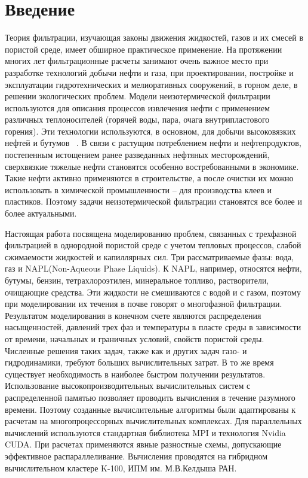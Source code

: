 \section{Введение}
Теория фильтрации, изучающая законы движения жидкостей, газов и их смесей в
пористой среде, имеет обширное практическое применение. На протяжении многих лет
фильтрационные расчеты занимают очень важное место при разработке технологий
добычи нефти и газа, при проектировании, постройке и эксплуатации
гидротехнических  и мелиоративных сооружений, в горном деле, в решении
экологических проблем.  Модели неизотермической фильтрации используются для описания
процессов извлечения нефти
с применением различных теплоносителей (горячей воды, пара, очага внутрипластового
горения). Эти технологии используются, в основном, для добычи высоковязких нефтей и бутумов ~\cite{Kanevskaya}.
В связи с растущим потреблением нефти и нефтепродуктов, постепенным истощением ранее разведанных
нефтяных месторождений, сверхвязкие тяжелые нефти становятся особенно востребованными в экономике. 
Такие нефти активно применяются в строительстве, а после очистки
их можно использовать в химической промышленности -- для производства клеев и пластиков.
Поэтому задачи неизотермической фильтрации
становятся все более и более актуальными.

Настоящая работа посвящена моделированию проблем, связанных с трехфазной фильтрацией 
в однородной пористой среде с учетом тепловых процессов, слабой сжимаемости жидкостей
и капиллярных сил.
Три рассматриваемые фазы: вода, газ и NAPL(Non-Aqueous Phase 
Liquids). К NAPL, например, относятся нефти, бутумы, бензин, тетрахлороэтилен, 
минеральное топливо, растворители, очищающие средства. 
Эти жидкости не смешиваются с водой и с газом,
поэтому при моделировании их течения
в почве говорят о многофазной фильтрации.
Результатом моделирования в конечном счете являются распределения насыщенностей, давлений
трех фаз и температуры в пласте среды в зависимости от времени, начальных и граничных
условий, свойств пористой среды. 
Численные решения таких задач, также как и других задач газо- и гидродинамики,
требуют больших вычислительных затрат. В то же время существует необходимость в
наиболее быстром получении результатов. Использование
высокопроизводительных вычислительных систем с распределенной памятью
позволяет проводить вычисления в течение разумного времени. Поэтому созданные
вычислительные алгоритмы были адаптированы к расчетам на многопроцессорных
вычислительных комплексах. Для параллельных вычислений используются стандартная
библиотека MPI и технология Nvidia CUDA. При расчетах применяются явные разностные 
схемы, допускающие эффективное распараллеливание. Вычисления проводятся
на гибридном вычислительном кластере K-100, ИПМ им. М.В.Келдыша РАН.
